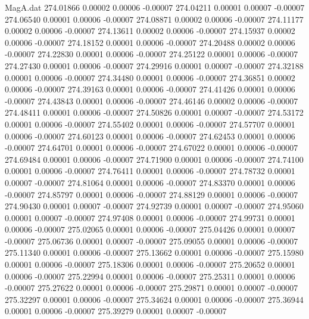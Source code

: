 \begin{filecontents}{MagA.dat}
 274.01866    0.00002    0.00006   -0.00007
 274.04211    0.00001    0.00007   -0.00007
 274.06540    0.00001    0.00006   -0.00007
 274.08871    0.00002    0.00006   -0.00007
 274.11177    0.00002    0.00006   -0.00007
 274.13611    0.00002    0.00006   -0.00007
 274.15937    0.00002    0.00006   -0.00007
 274.18152    0.00001    0.00006   -0.00007
 274.20488    0.00002    0.00006   -0.00007
 274.22830    0.00001    0.00006   -0.00007
 274.25122    0.00001    0.00006   -0.00007
 274.27430    0.00001    0.00006   -0.00007
 274.29916    0.00001    0.00007   -0.00007
 274.32188    0.00001    0.00006   -0.00007
 274.34480    0.00001    0.00006   -0.00007
 274.36851    0.00002    0.00006   -0.00007
 274.39163    0.00001    0.00006   -0.00007
 274.41426    0.00001    0.00006   -0.00007
 274.43843    0.00001    0.00006   -0.00007
 274.46146    0.00002    0.00006   -0.00007
 274.48411    0.00001    0.00006   -0.00007
 274.50826    0.00001    0.00007   -0.00007
 274.53172    0.00001    0.00006   -0.00007
 274.55402    0.00001    0.00006   -0.00007
 274.57707    0.00001    0.00006   -0.00007
 274.60123    0.00001    0.00006   -0.00007
 274.62453    0.00001    0.00006   -0.00007
 274.64701    0.00001    0.00006   -0.00007
 274.67022    0.00001    0.00006   -0.00007
 274.69484    0.00001    0.00006   -0.00007
 274.71900    0.00001    0.00006   -0.00007
 274.74100    0.00001    0.00006   -0.00007
 274.76411    0.00001    0.00006   -0.00007
 274.78732    0.00001    0.00007   -0.00007
 274.81064    0.00001    0.00006   -0.00007
 274.83370    0.00001    0.00006   -0.00007
 274.85797    0.00001    0.00006   -0.00007
 274.88129    0.00001    0.00006   -0.00007
 274.90430    0.00001    0.00007   -0.00007
 274.92739    0.00001    0.00007   -0.00007
 274.95060    0.00001    0.00007   -0.00007
 274.97408    0.00001    0.00006   -0.00007
 274.99731    0.00001    0.00006   -0.00007
 275.02065    0.00001    0.00006   -0.00007
 275.04426    0.00001    0.00007   -0.00007
 275.06736    0.00001    0.00007   -0.00007
 275.09055    0.00001    0.00006   -0.00007
 275.11340    0.00001    0.00006   -0.00007
 275.13662    0.00001    0.00006   -0.00007
 275.15980    0.00001    0.00006   -0.00007
 275.18306    0.00001    0.00006   -0.00007
 275.20652    0.00001    0.00006   -0.00007
 275.22994    0.00001    0.00006   -0.00007
 275.25311    0.00001    0.00006   -0.00007
 275.27622    0.00001    0.00006   -0.00007
 275.29871    0.00001    0.00007   -0.00007
 275.32297    0.00001    0.00006   -0.00007
 275.34624    0.00001    0.00006   -0.00007
 275.36944    0.00001    0.00006   -0.00007
 275.39279    0.00001    0.00007   -0.00007

\end{filecontents}
